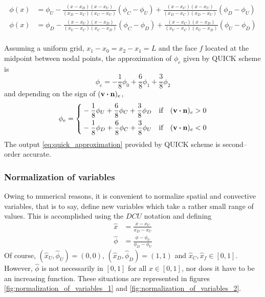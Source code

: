 \begin{align}
	\phi(x) &= 
	\phi_U - 
	\frac{(x - x_D)(x - x_U)}{(x_D - x_C)(x_C - x_U)} (\phi_C - \phi_U) + 
	\frac{(x - x_C)(x - x_U)}{(x_D - x_C)(x_D - x_U)} (\phi_D - \phi_U) \\
	\phi(x) &= 
	\phi_D - 
	\frac{(x - x_U)(x - x_D)}{(x_U - x_C)(x_C - x_D)} (\phi_C - \phi_D) + 
	\frac{(x - x_C)(x - x_D)}{(x_U - x_C)(x_U - x_D)} (\phi_U - \phi_D) \\
\end{align}

\clearpage

Assuming a uniform grid, \ie $x_1 - x_0 = x_2 - x_1 = L$ and the face $f$ located at the midpoint between nodal points, the approximation of $\phi_e$ given by QUICK scheme is
\begin{equation}
	\phi_e = -\frac{1}{8} \phi_0 + \frac{6}{8} \phi_1 + \frac{3}{8} \phi_2
\end{equation}
and depending on the sign of $(\vb{v} \vdot \vb{n})_e$,
\begin{equation} \label{eq:quick_approximation}
	\phi_e = 
	\left\{
	\begin{aligned}
		&-\frac{1}{8} \phi_U + \frac{6}{8} \phi_C + \frac{3}{8} \phi_D & 
		&\text{if} \quad (\vb{v} \vdot \vb{n})_e > 0 \\
		&-\frac{1}{8} \phi_D + \frac{6}{8} \phi_C + \frac{3}{8} \phi_U & 
		&\text{if} \quad (\vb{v} \vdot \vb{n})_e < 0 \\
	\end{aligned}
	\right.
\end{equation}
The output \eqref{eq:quick_approximation} provided by QUICK scheme is second--order accurate.






\subsubsection{Normalization of variables}

Owing to numerical reasons, it is convenient to normalize spatial and convective variables, that is to say, define new variables which take a rather small range of values. This is accomplished using the $DCU$ notation and defining 
\begin{align*}
	\hat{x} &= \frac{x - x_U}{x_D - x_U} \\
	\hat{\phi} &= \frac{\phi - \phi_U}{\phi_D - \phi_U}
\end{align*}
Of course, $(\hat{x}_U, \hat{\phi}_U) = (0,0)$, $(\hat{x}_D, \hat{\phi}_D) = (1,1)$ and $\hat{x}_C, \hat{x}_f \in [0,1]$. However, $\hat{\phi}$ is not necessarily in $[0,1]$ for all $x \in [0,1]$, nor does it have to be an increasing function. These situations are represented in figures \ref{fig:normalization_of_variables_1} and \ref{fig:normalization_of_variables_2}.

